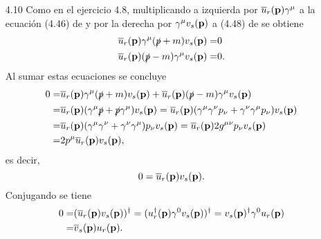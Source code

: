 \documentclass{article}
\begin{document}
\begin{enumerate}
\item[4.10] Como en el ejercicio 4.8, multiplicando a izquierda por $\overline{u}_r(\vb{p})\gamma^\mu$ a la ecuación (4.46) de \cite{Lahiri2005} y por la derecha por $\gamma^\mu v_s(\vb{p})$ a (4.48) de \cite{Lahiri2005} se obtiene
\begin{align}
\begin{split}
\overline{u}_r(\vb{p})\gamma^\mu(\slashed{p}+m)v_s(\vb{p})=&0\\
\overline{u}_r(\vb{p})(\slashed{p}-m)\gamma^\mu v_s(\vb{p})=&0.
\end{split}
\end{align}
Al sumar estas ecuaciones se concluye
\begin{align}
\begin{split}
0=&\overline{u}_r(\vb{p})\gamma^\mu(\slashed{p}+m)v_s(\vb{p})+\overline{u}_r(\vb{p})(\slashed{p}-m)\gamma^\mu v_s(\vb{p})\\
=&\overline{u}_r(\vb{p})(\gamma^\mu\slashed{p}+\slashed{p}\gamma^\mu)v_s(\vb{p})=\overline{u}_r(\vb{p})(\gamma^\mu\gamma^\nu p_\nu+\gamma^\nu\gamma^\mu p_\nu)v_s(\vb{p})\\
=&\overline{u}_r(\vb{p})(\gamma^\mu\gamma^\nu+\gamma^\nu\gamma^\mu)p_\nu v_s(\vb{p})=\overline{u}_r(\vb{p})2g^{\mu\nu}p_\nu v_s(\vb{p})\\
=&2p^\mu\overline{u}_r(\vb{p})v_s(\vb{p}),
\end{split}
\end{align}
es decir,
\begin{equation}\label{ec:ortogonalidad_1}
0=\overline{u}_r(\vb{p})v_s(\vb{p}).
\end{equation}
Conjugando se tiene
\begin{align}\label{ec:ortogonalidad_2}
\begin{split}
0=&(\overline{u}_r(\vb{p})v_s(\vb{p}))^\dagger=(u_r^\dagger(\vb{p})\gamma^0v_s(\vb{p}))^\dagger=v_s(\vb{p})^\dagger\gamma^0 u_r(\vb{p})\\
=&\overline{v}_s(\vb{p})u_r(\vb{p}).
\end{split}
\end{align}


\end{enumerate}
\end{document}
